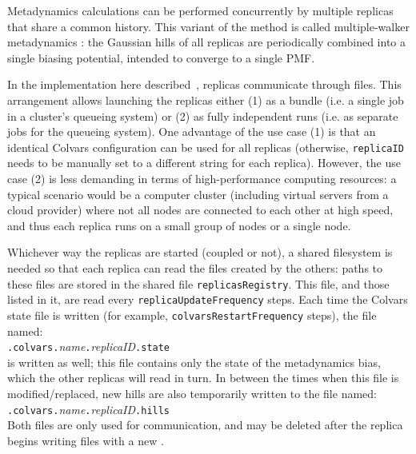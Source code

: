 Metadynamics calculations can be performed concurrently by multiple replicas that share a common history.
This variant of the method is called multiple-walker metadynamics \cite{Raiteri2006}: the Gaussian hills of all replicas are periodically combined into a single biasing potential, intended to converge to a single PMF.

In the implementation here described~\cite{Fiorin2013}, replicas communicate through files.
This arrangement allows launching the replicas either (1) as a bundle (i.e.{} a single job in a cluster's queueing system) or (2) as fully independent runs (i.e.{} as separate jobs for the queueing system).
One advantage of the use case (1) is that an identical Colvars configuration can be used for all replicas (otherwise, \texttt{replicaID} needs to be manually set to a different string for each replica).
However, the use case (2) is less demanding in terms of high-performance computing resources: a typical scenario would be a computer cluster (including virtual servers from a cloud provider) where not all nodes are connected to each other at high speed, and thus each replica runs on a small group of nodes or a single node.

Whichever way the replicas are started (coupled or not), a shared filesystem is needed so that each replica can read the files created by the others: paths to these files are stored in the shared file \texttt{replicasRegistry}.
This file, and those listed in it, are read every \texttt{replicaUpdateFrequency} steps.
Each time the Colvars state file is written (for example, \texttt{colvarsRestartFrequency} steps), the file named:\\
\outputName\texttt{.colvars.}\emph{name}\texttt{.}\emph{replicaID}\texttt{.state}\\
is written as well; this file contains only the state of the metadynamics bias, which the other replicas will read in turn.
In between the times when this file is modified/replaced, new hills are also temporarily written to the file named:\\
\outputName\texttt{.colvars.}\emph{name}\texttt{.}\emph{replicaID}\texttt{.hills}\\
Both files are only used for communication, and may be deleted after the replica begins writing files with a new \outputName.\\

